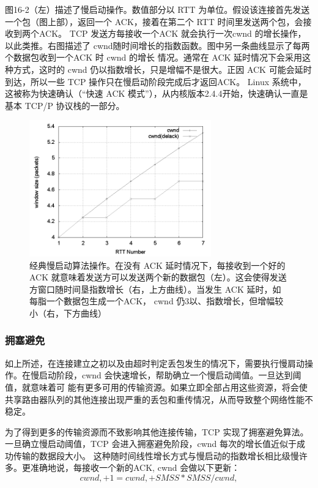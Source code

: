 图16-2（左）描述了慢启动操作。数值部分以 RTT 为单位。假设该连接首先发送一个包（图上部），返回一个 ACK，接着在第二个 RTT 时间里发送两个包，会接收到两个ACK。
TCP 发送方每接收一个ACK 就会执行一次cwnd 的增长操作，以此类推。右图描述了 cwnd随时间增长的指数函数。图中另一条曲线显示了每两个数据包收到一个ACK 时 cwnd 的增长
情况。通常在 ACK 延时情况下会采用这种方式，这时的 cwnd 仍以指数增长，只是增幅不是很大。正因 ACK 可能会延时到达，所以一些 TCP 操作只在慢启动阶段完成后才返回ACK。
Linux 系统中，这被称为快速确认（“快速 ACK 模式”），从内核版本2.4.4开始，快速确认一直是基本 TCP/P 协议栈的一部分。

\begin{figure}[!htb]
    \centering
	\includegraphics[width=0.7\textwidth]{imgs/16/16-3.png}
	\caption{经典慢启动算法操作。在没有 ACK 延时情况下，每接收到一个好的ACK 就意味着发送方可以发送两个新的数据包（左）。这会使得发送方窗口随时间垦指数增长（右，上方曲线）。当发生
    ACK 延时，如每脂一个數据包生成一个ACK， cwnd 仍3以、指数增长，但增幅较小（右，下方曲线）}
\end{figure}

\subsubsection{拥塞避免}
如上所述，在连接建立之初以及由超时判定丢包发生的情况下，需要执行慢肩动操作。在慢启动阶段，cwnd 会快速增长，帮助确立一个慢启动阈值。一旦达到阈值，就意味着可
能有更多可用的传输资源。如果立即全部占用这些资源，将会使共享路由器队列的其他连接出现严重的丢包和重传情况，从而导致整个网络性能不稳定。

为了得到更多的传输资源而不致影响其他连接传输，TCP 实现了拥塞避免算法。一旦确立慢启动阈值，TCP 会进入拥塞避免阶段，cwnd 每次的增长值近似于成功传输的数据段大小。
这种随时间线性增长方式与慢启动的指数增长相比级慢许多。更准确地说，每接收一个新的ACK, cwnd 会做以下更新：
\begin{equation}
    cwnd, + 1 = cwnd, + SMSS * SMSS/cwnd,
\end{equation}

